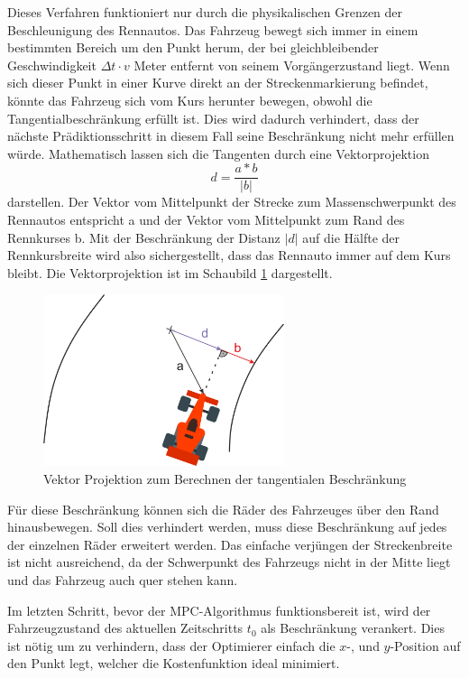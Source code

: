 \documentclass{like}
\begin{document}
Dieses Verfahren funktioniert nur durch die physikalischen Grenzen der Beschleunigung des Rennautos. Das Fahrzeug bewegt sich immer in einem bestimmten Bereich um den Punkt herum, der bei gleichbleibender Geschwindigkeit $\Delta t \cdot v$ Meter entfernt von seinem Vorgängerzustand liegt. Wenn sich dieser Punkt in einer Kurve direkt an der Streckenmarkierung befindet, könnte das Fahrzeug sich vom Kurs herunter bewegen, obwohl die Tangentialbeschränkung erfüllt ist. Dies wird dadurch verhindert, dass der nächste Prädiktionsschritt in diesem Fall seine Beschränkung nicht mehr erfüllen würde.
Mathematisch lassen sich die Tangenten durch eine Vektorprojektion 
\begin{equation}
	d = \frac{a*b}{|b|}
\end{equation}
darstellen. Der Vektor vom Mittelpunkt der Strecke zum Massenschwerpunkt des Rennautos entspricht a und der Vektor vom Mittelpunkt zum Rand des Rennkurses b. Mit der Beschränkung der Distanz $|d|$ auf die Hälfte der Rennkursbreite wird also sichergestellt, dass das Rennauto immer auf dem Kurs bleibt.
Die Vektorprojektion ist im Schaubild \ref{fig:vektorProjektion} dargestellt.

\begin{figure}[ht!]
	\centering
	\includegraphics[width=200pt]{Abbildungen/vektorProjection.png}
	\caption{Vektor Projektion zum Berechnen der tangentialen Beschränkung}
	\label{fig:vektorProjektion}
\end{figure}

Für diese Beschränkung können sich die Räder des Fahrzeuges über den Rand hinaus\-be\-we\-gen. Soll dies verhindert werden, muss diese Beschränkung auf jedes der einzelnen Räder erweitert werden. Das einfache verjüngen der Streckenbreite ist nicht ausreichend, da der Schwerpunkt des Fahrzeugs nicht in der Mitte liegt und das Fahrzeug auch quer stehen kann.

Im letzten Schritt, bevor der \ac{MPC}-Algorithmus funktionsbereit ist, wird der Fahrzeug\-zu\-stand des aktuellen Zeitschritts $t_0$ als Beschränkung verankert.  Dies ist nötig um zu verhindern, dass der Optimierer einfach die \(x\)-, und \(y\)-Position auf den Punkt legt, welcher die Kostenfunktion ideal minimiert. 
\end{document}
